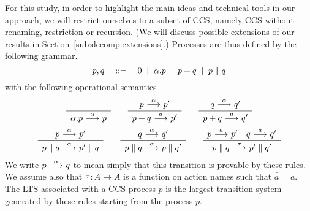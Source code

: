 For this study, 
in order to highlight the main ideas and technical tools in our approach,
we will restrict ourselves to a subset of CCS, namely CCS without
renaming, restriction or recursion. 
(We will discuss possible extensions of our results in 
Section~\ref{sub:decomp:extensions}.)
Processes are thus defined by the following
grammar.
\[
    p,q \quad::=\quad 0 \;\;|\;\; \alpha.p \;\;|\;\; p + q \;\;|\;\; p \parallel q
\]
with the following operational semantics
\begin{gather*}
    \sosrule{}{\alpha.p \trans{\alpha} p} \qquad
    \sosrule{p\trans{\alpha}p'}{p + q \trans{a} p'} \qquad
    \sosrule{q\trans{\alpha}q'}{p + q \trans{a} q'} \\
    \sosrule{p\trans{\alpha}p'}{p \parallel q \trans{\alpha} p' \parallel q} \qquad
    \sosrule{q\trans{\alpha}q'}{p \parallel q \trans{\alpha} p \parallel q'} \qquad
    \sosrule{p\trans{a}p'\quad q\trans{\bar{a}}q'}{p \parallel q \trans{\tau} p' \parallel q'}
\end{gather*}
We write $p\ {\stackrel{{\alpha}}{\longrightarrow}}\ q$ to mean simply that this transition is provable by
these rules. We assume also that $\bar{\cdot} : A\rightarrow A$ is a function on action names
such that $\bar{\bar{a}} = a$.
The LTS associated with a CCS process $p$ is the largest transition system 
generated by these
rules starting from the process $p$. 

